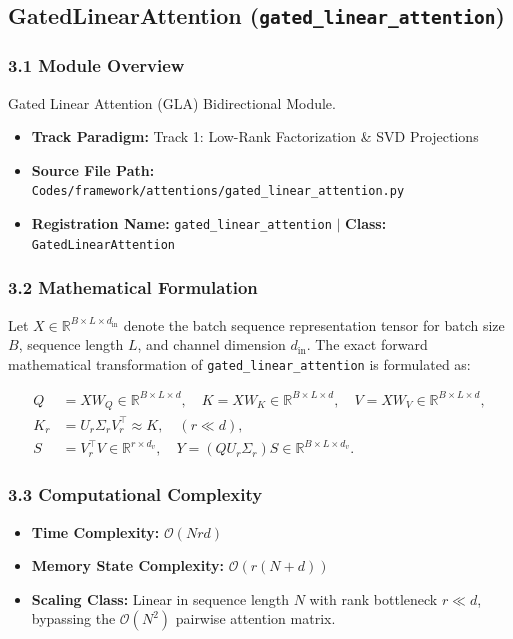 \subsection{GatedLinearAttention (\texttt{gated\_linear\_attention})}
\label{sec:app_module_gated_linear_attention}

\subsubsection*{3.1 Module Overview}
Gated Linear Attention (GLA) Bidirectional Module.
\begin{itemize}
    \item \textbf{Track Paradigm:} Track 1: Low-Rank Factorization \& SVD Projections
    \item \textbf{Source File Path:} \texttt{Codes/framework/attentions/gated\_linear\_attention.py}
    \item \textbf{Registration Name:} \texttt{gated\_linear\_attention} $\mid$ \textbf{Class:} \texttt{GatedLinearAttention}
\end{itemize}

\subsubsection*{3.2 Mathematical Formulation}
Let $X \in \mathbb{R}^{B \times L \times d_{\text{in}}}$ denote the batch sequence representation tensor for batch size $B$, sequence length $L$, and channel dimension $d_{\text{in}}$. The exact forward mathematical transformation of \texttt{gated\_linear\_attention} is formulated as:

\begin{align}
Q &= X W_Q \in \mathbb{R}^{B \times L \times d}, \quad K = X W_K \in \mathbb{R}^{B \times L \times d}, \quad V = X W_V \in \mathbb{R}^{B \times L \times d}, \\
K_r &= U_r \Sigma_r V_r^\top \approx K, \quad (r \ll d), \\
S &= V_r^\top V \in \mathbb{R}^{r \times d_v}, \quad Y = (Q U_r \Sigma_r) S \in \mathbb{R}^{B \times L \times d_v}.
\end{align}


\subsubsection*{3.3 Computational Complexity}
\begin{itemize}
    \item \textbf{Time Complexity:} $\mathcal{O}(N r d)$
    \item \textbf{Memory State Complexity:} $\mathcal{O}(r(N + d))$
    \item \textbf{Scaling Class:} Linear in sequence length $N$ with rank bottleneck $r \ll d$, bypassing the $\mathcal{O}(N^2)$ pairwise attention matrix.
\end{itemize}

